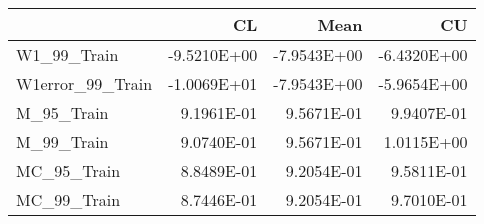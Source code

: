\begin{tabular}{lrrr}
\toprule
{} &          CL &        Mean &          CU \\
\midrule
W1\_99\_Train      & -9.5210E+00 & -7.9543E+00 & -6.4320E+00 \\
W1error\_99\_Train & -1.0069E+01 & -7.9543E+00 & -5.9654E+00 \\
M\_95\_Train       &  9.1961E-01 &  9.5671E-01 &  9.9407E-01 \\
M\_99\_Train       &  9.0740E-01 &  9.5671E-01 &  1.0115E+00 \\
MC\_95\_Train      &  8.8489E-01 &  9.2054E-01 &  9.5811E-01 \\
MC\_99\_Train      &  8.7446E-01 &  9.2054E-01 &  9.7010E-01 \\
\bottomrule
\end{tabular}
